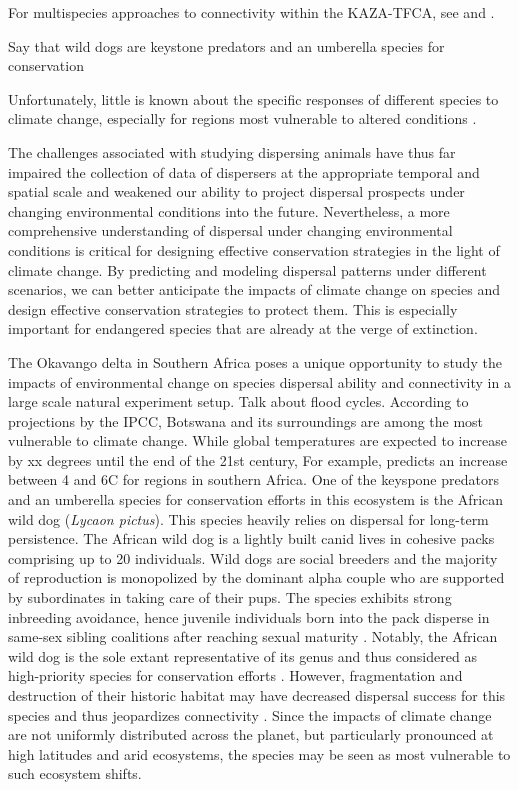\documentclass[abstract=on,10pt,a4paper,bibliography=totocnumbered]{article}
\begin{document}
For multispecies approaches to connectivity within the KAZA-TFCA, see
\cite{Brennan.2020} and \cite{Lines.2021}.




Say that wild dogs are keystone predators and an umberella species for
conservation

Unfortunately, little is known about the specific responses of different species
to climate change, especially for regions most vulnerable to altered conditions
\citep{Paniw.2021}.

The challenges associated with studying dispersing animals have thus far
impaired the collection of data of dispersers at the appropriate temporal and
spatial scale \citep{Graves.2014, Vasudev.2015} and weakened our ability to
project dispersal prospects under changing environmental conditions into the
future. Nevertheless, a more comprehensive understanding of dispersal under
changing environmental conditions is critical for designing effective
conservation strategies in the light of climate change. By predicting and
modeling dispersal patterns under different scenarios, we can better anticipate
the impacts of climate change on species and design effective conservation
strategies to protect them. This is especially important for endangered species
that are already at the verge of extinction.

The Okavango delta in Southern Africa poses a unique opportunity to study the
impacts of environmental change on species dispersal ability and connectivity in
a large scale natural experiment setup. Talk about flood cycles. According to
projections by the IPCC, Botswana and its surroundings are among the most
vulnerable to climate change. While global temperatures are expected to increase
by xx degrees until the end of the 21st century, For example,
\cite{Engelbrecht.2015a} predicts an increase between 4 and 6\degree C for
regions in southern Africa. One of the keyspone predators and an umberella
species for conservation efforts in this ecosystem is the African wild dog
(\textit{Lycaon pictus}). This species heavily relies on dispersal for long-term
persistence. The African wild dog is a lightly built canid lives in cohesive
packs comprising up to 20 individuals. Wild dogs are social breeders and the
majority of reproduction is monopolized by the dominant alpha couple who are
supported by subordinates in taking care of their pups. The species exhibits
strong inbreeding avoidance, hence juvenile individuals born into the pack
disperse in same-sex sibling coalitions after reaching sexual maturity
\citep{McNutt.1996, Behr.2020}. Notably, the African wild dog is the sole extant
representative of its genus and thus considered as high-priority species for
conservation efforts \citep{Leigh.2012}. However, fragmentation and destruction
of their historic habitat may have decreased dispersal success for this species
and thus jeopardizes connectivity \citep{Leigh.2012}. Since the impacts of
climate change are not uniformly distributed across the planet, but particularly
pronounced at high latitudes and arid ecosystems, the species may be seen as
most vulnerable to such ecosystem shifts.
\end{document}
